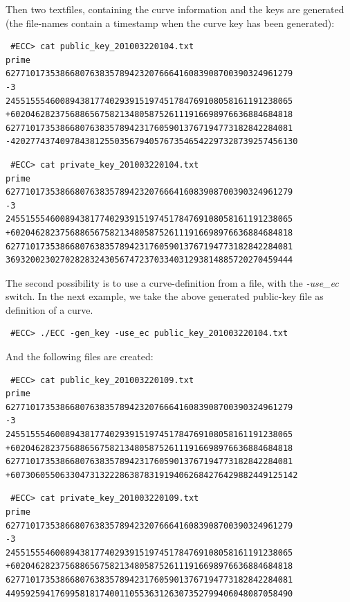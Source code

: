 \documentclass[11pt,english]{article}
\begin{document}
Then two textfiles, containing the curve information and the keys are generated (the file-names contain a timestamp when the curve key has been generated):

\begin{verbatim}
 #ECC> cat public_key_201003220104.txt
prime
6277101735386680763835789423207666416083908700390324961279
-3
2455155546008943817740293915197451784769108058161191238065
+602046282375688656758213480587526111916698976636884684818
6277101735386680763835789423176059013767194773182842284081
-4202774374097843812550356794057673546542297328739257456130
\end{verbatim}

\begin{verbatim}
 #ECC> cat private_key_201003220104.txt
prime
6277101735386680763835789423207666416083908700390324961279
-3
2455155546008943817740293915197451784769108058161191238065
+602046282375688656758213480587526111916698976636884684818
6277101735386680763835789423176059013767194773182842284081
3693200230270282832430567472370334031293814885720270459444
\end{verbatim}

The second possibility is to use a curve-definition from a file, with the \emph{-use_ec} switch. In the next example, we take the above generated public-key file as definition of a curve.

\begin{verbatim}
 #ECC> ./ECC -gen_key -use_ec public_key_201003220104.txt
\end{verbatim}

And the following files are created:

\begin{verbatim}
 #ECC> cat public_key_201003220109.txt
prime
6277101735386680763835789423207666416083908700390324961279
-3
2455155546008943817740293915197451784769108058161191238065
+602046282375688656758213480587526111916698976636884684818
6277101735386680763835789423176059013767194773182842284081
+6073060550633047313222863878319194062684276429882449125142
\end{verbatim}
\begin{verbatim}
 #ECC> cat private_key_201003220109.txt
prime
6277101735386680763835789423207666416083908700390324961279
-3
2455155546008943817740293915197451784769108058161191238065
+602046282375688656758213480587526111916698976636884684818
6277101735386680763835789423176059013767194773182842284081
4495925941769958181740011055363126307352799406048087058490
\end{verbatim}
\end{document}
